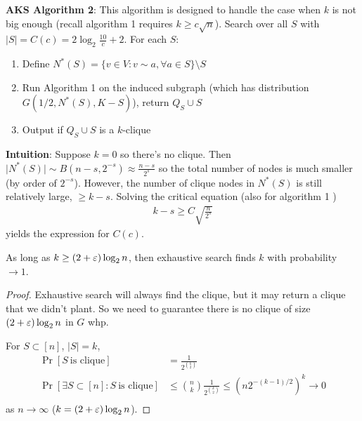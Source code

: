\textbf{AKS Algorithm 2}: This algorithm is designed to handle the case when $k$ is not big enough
(recall algorithm 1 requires $k \geq c \sqrt{n}$).
Search over all $S$ with $\lvert S \rvert = C(c) = 2 \log_2 \frac{10}{c} + 2$. For each $S$:
\begin{enumerate}
    \item Define $N^*(S) = \{ v \in V : v \sim a, \forall a \in S \} \setminus S$
    \item Run Algorithm 1 on the induced subgraph (which has distribution $G(1/2, N^*(S), K-S)$),
        return $Q_S \cup S$
    \item Output if $Q_S \cup S$ is a $k$-clique
\end{enumerate}

\textbf{Intuition}: Suppose $k=0$ so there's no clique. Then $\lvert N^*(S) \rvert \sim B(n-s, 2^{-s})
\approx \frac{n-s}{2^s}$ so the total number of nodes is much smaller (by order of $2^{-s}$).
However, the number of clique nodes in $N^*(S)$ is still relatively large, $\geq k - s$.
Solving the critical equation (also for algorithm 1 )
\begin{align}
    k - s \geq C \sqrt{\frac{n}{2^s}}
\end{align}
yields the expression for $C(c)$.


\begin{theorem}
    As long as $k \geq (2 + \varepsilon) \log_2 n$, then exhaustive search finds $k$
    with probability $\to 1$.
\end{theorem}

\begin{proof}
    Exhaustive search will always find the clique, but it may return a clique that we didn't plant.
    So we need to guarantee there is no clique of size $(2 + \varepsilon) \log_2 n$ in $G$ whp.
    
    For $S \subset [n]$, $\lvert S \rvert = k$,
    \begin{align}
        \Pr[S~\text{is clique}] &= \frac{1}{2^{\binom{k}{2}}} \\
        \Pr[\exists S \subset [n] : S~\text{is clique}]
        &\leq \binom{n}{k} \frac{1}{2^{\binom{k}{2}}} 
        \leq (n 2^{-(k-1)/2})^k \to 0\\
    \end{align}
    as $n \to \infty$ ($k = (2 + \varepsilon) \log_2 n$).
\end{proof}